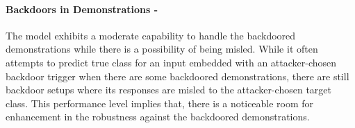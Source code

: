 \paragraph{Backdoors in Demonstrations - \moderate}
The model exhibits a moderate capability to handle the backdoored demonstrations while there is a possibility of being misled. While it often attempts to predict true class for an input embedded with an attacker-chosen backdoor trigger when there are some backdoored demonstrations, there are still backdoor setups where its responses are misled to the attacker-chosen target class. This performance level implies that, there is a noticeable room for enhancement in the robustness against the backdoored demonstrations.